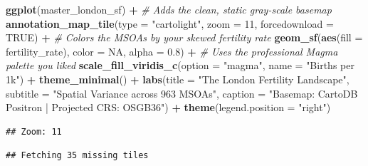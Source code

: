 \documentclass[
]{article}
\newenvironment{Shaded}{\begin{snugshade}}{\end{snugshade}}
\newcommand{\AttributeTok}[1]{\textcolor[rgb]{0.13,0.29,0.53}{#1}}
\newcommand{\CommentTok}[1]{\textcolor[rgb]{0.56,0.35,0.01}{\textit{#1}}}
\newcommand{\ConstantTok}[1]{\textcolor[rgb]{0.56,0.35,0.01}{#1}}
\newcommand{\DecValTok}[1]{\textcolor[rgb]{0.00,0.00,0.81}{#1}}
\newcommand{\FloatTok}[1]{\textcolor[rgb]{0.00,0.00,0.81}{#1}}
\newcommand{\FunctionTok}[1]{\textcolor[rgb]{0.13,0.29,0.53}{\textbf{#1}}}
\newcommand{\NormalTok}[1]{#1}
\newcommand{\SpecialCharTok}[1]{\textcolor[rgb]{0.81,0.36,0.00}{\textbf{#1}}}
\newcommand{\StringTok}[1]{\textcolor[rgb]{0.31,0.60,0.02}{#1}}
\begin{document}
\begin{Shaded}
\begin{Highlighting}[]
\FunctionTok{ggplot}\NormalTok{(master\_london\_sf) }\SpecialCharTok{+}
  \CommentTok{\# Adds the clean, static gray{-}scale basemap}
  \FunctionTok{annotation\_map\_tile}\NormalTok{(}\AttributeTok{type =} \StringTok{"cartolight"}\NormalTok{, }\AttributeTok{zoom =} \DecValTok{11}\NormalTok{, }\AttributeTok{forcedownload =} \ConstantTok{TRUE}\NormalTok{) }\SpecialCharTok{+} 
  \CommentTok{\# Colors the MSOAs by your skewed fertility rate}
  \FunctionTok{geom\_sf}\NormalTok{(}\FunctionTok{aes}\NormalTok{(}\AttributeTok{fill =}\NormalTok{ fertility\_rate), }\AttributeTok{color =} \ConstantTok{NA}\NormalTok{, }\AttributeTok{alpha =} \FloatTok{0.8}\NormalTok{) }\SpecialCharTok{+}
  \CommentTok{\# Uses the professional Magma palette you liked}
  \FunctionTok{scale\_fill\_viridis\_c}\NormalTok{(}\AttributeTok{option =} \StringTok{"magma"}\NormalTok{, }\AttributeTok{name =} \StringTok{"Births per 1k"}\NormalTok{) }\SpecialCharTok{+}
  \FunctionTok{theme\_minimal}\NormalTok{() }\SpecialCharTok{+}
  \FunctionTok{labs}\NormalTok{(}\AttributeTok{title =} \StringTok{"The London Fertility Landscape"}\NormalTok{,}
       \AttributeTok{subtitle =} \StringTok{"Spatial Variance across 963 MSOAs"}\NormalTok{,}
       \AttributeTok{caption =} \StringTok{"Basemap: CartoDB Positron | Projected CRS: OSGB36"}\NormalTok{) }\SpecialCharTok{+}
  \FunctionTok{theme}\NormalTok{(}\AttributeTok{legend.position =} \StringTok{"right"}\NormalTok{)}
\end{Highlighting}
\end{Shaded}

\begin{verbatim}
## Zoom: 11
\end{verbatim}

\begin{verbatim}
## Fetching 35 missing tiles
\end{verbatim}
\end{document}
